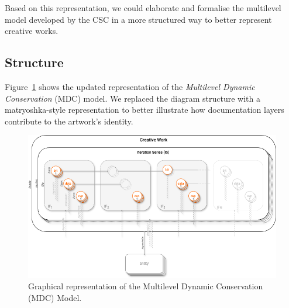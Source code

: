 Based on this representation, we could elaborate and formalise the multilevel model developed by the CSC in a more structured way to better represent creative works.

\subsection{Structure}
Figure~\ref{fig:c3-mdc} shows the updated representation of the \textit{Multilevel Dynamic Conservation} (MDC) model. We replaced the diagram structure with a matryoshka-style representation to better illustrate how documentation layers contribute to the artwork's identity.

\begin{figure}[!h]
    \centering
    \includegraphics[width=\linewidth]{chapters/3-mdc_model-reactivation_workflow-instruction_template/image/graph03-mdc.png}
    \caption{Graphical representation of the Multilevel Dynamic Conservation (MDC) Model.}
    \label{fig:c3-mdc}
\end{figure} 

